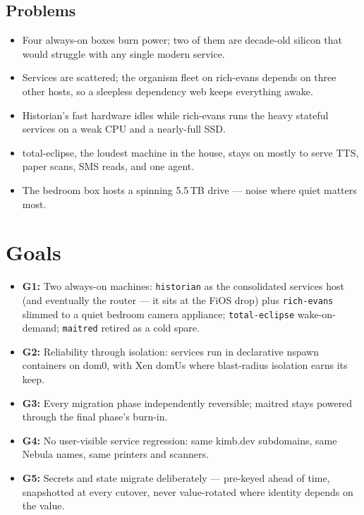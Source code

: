 \documentclass[11pt,letterpaper,headings=small]{scrartcl}
\begin{document}
\subsection{Problems}

\begin{itemize}
  \item Four always-on boxes burn power; two of them are decade-old
        silicon that would struggle with any single modern service.
  \item Services are scattered; the organism fleet on rich-evans depends
        on three other hosts, so a sleepless dependency web keeps
        everything awake.
  \item Historian's fast hardware idles while rich-evans runs the heavy
        stateful services on a weak CPU and a nearly-full SSD.
  \item total-eclipse, the loudest machine in the house, stays on mostly
        to serve TTS, paper scans, SMS reads, and one agent.
  \item The bedroom box hosts a spinning 5.5\,TB drive --- noise where
        quiet matters most.
\end{itemize}

\section{Goals}

\begin{itemize}
  \item \textbf{G1:} Two always-on machines: \texttt{historian} as the
        consolidated services host (and eventually the router --- it sits
        at the FiOS drop) plus \texttt{rich-evans} slimmed to a quiet
        bedroom camera appliance; \texttt{total-eclipse} wake-on-demand;
        \texttt{maitred} retired as a cold spare.
  \item \textbf{G2:} Reliability through isolation: services run in
        declarative nspawn containers on dom0, with Xen domUs where
        blast-radius isolation earns its keep.
  \item \textbf{G3:} Every migration phase independently reversible;
        maitred stays powered through the final phase's burn-in.
  \item \textbf{G4:} No user-visible service regression: same kimb.dev
        subdomains, same Nebula names, same printers and scanners.
  \item \textbf{G5:} Secrets and state migrate deliberately --- pre-keyed
        ahead of time, snapshotted at every cutover, never value-rotated
        where identity depends on the value.
\end{itemize}
\end{document}

